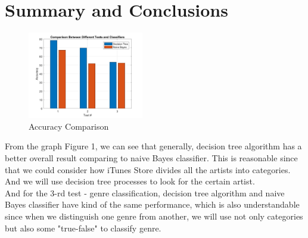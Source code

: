 \documentclass[twoside,twocolumn]{article}
\begin{document}
    \section{Summary and Conclusions}
    \begin{figure}[h]
        \includegraphics[width = 0.45\textwidth]{comparison.jpg}
        \caption{Accuracy Comparison}
        \label{fig:1}
    \end{figure}
    From the graph Figure 1, we can see that generally, decision tree algorithm has a better overall result comparing to naive Bayes
    classifier. This is reasonable since that we could consider how iTunes Store divides all the artists into categories. And we will 
    use decision tree processes to look for the certain artist. \\
    And for the 3-rd test - genre classification, decision tree algorithm and naive Bayes classifier have kind of the same performance,
    which is also understandable since when we distinguish one genre from another, we will use not only categories but also some "true-false"
    to classify genre.

    \mbox{~}
    \clearpage
    \begin{appendices}
        
    \end{appendices}
\end{document}
